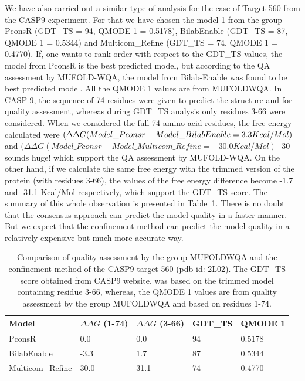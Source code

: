 \documentclass[12pt]{article}
\newcommand{\Alberto}[1]{\color{ForestGreen}#1\normalcolor }
\begin{document}
We have also carried out a similar type of analysis for the case of Target 560 from the CASP9 experiment. For that 
we have chosen the model 1 from the group PconsR (GDT\_TS = 94, QMODE 1 = 0.5178), Bilab\-Enable (GDT\_TS = 87, QMODE 1 = 0.5344) 
and Multicom\_Refine (GDT\_TS = 74, QMODE 1 = 0.4770). If, one wants to rank order with respect to the GDT\_TS values, the model from 
PconsR is the best predicted model, but according to the QA assessment by MUFOLD-WQA, the model from Bilab-Enable was found to be best predicted model. 
All the QMODE 1 values are from MUFOLD\-WQA. In CASP 9, the sequence of 74 residues were given to predict the structure and for 
quality assessment, whereas during GDT\_TS analysis only residues 3-66 were considered. When we considered the full 74 amino acid 
residues, the free energy calculated were $(\Delta \Delta G (Model\_Pconsr - Model\_Bilab\-Enable = 3.3 Kcal/Mol)$ and 
$(\Delta \Delta G (Model\_Pconsr - Model\_Multicom\_Refine = -30.0 Kcal/Mol)$ \Alberto{-30 sounds
huge!} which 
support the QA assessment by MUFOLD-WQA. On the other hand, if we calculate the same free energy with the trimmed version of the protein 
(with residues 3-66), the values of the free energy difference become -1.7 and -31.1 Kcal/Mol respectively, which support the GDT\_TS score. 
The summary of this whole observation is presented in Table~\ref{table:560QA}.
There is no doubt that the consensus approach can predict the model quality in a faster manner. But
we expect that the confinement
method can predict the model quality in a relatively expensive but much more accurate way.

\begin{table}
\label{table:560QA}
\begin{center}
\begin{tabular}{| l | l | l | l | l |}
\hline
Model            &  $\Delta \Delta G$ (1-74)  & $\Delta \Delta G$ (3-66) &    GDT\_TS    & QMODE 1  \\ \hline
PconsR           &         0.0                &      0.0                 &    94         &  0.5178   \\ \hline
Bilab\-Enable     &        -3.3                &      1.7                 &    87         &  0.5344   \\ \hline
Multicom\_Refine &        30.0                &     31.1                 &    74         &  0.4770   \\ \hline
\end{tabular}
\end{center}
\caption{Comparison of quality assessment by the group MUFOLD\-WQA and the confinement method of the CASP9 target 560 (pdb id: 2L02). 
The GDT\_TS score obtained from CASP9 website, was based on the trimmed model containing residue 3-66, whereas, the QMODE 1 values are from
quality assessment by the group MUFOLD\-WQA and based on residues 1-74.}
\end{table}  
\end{document}
